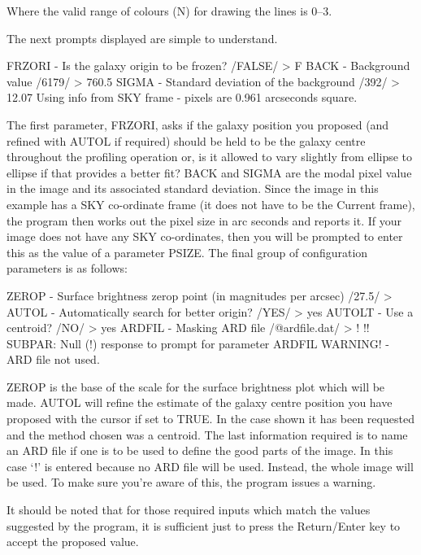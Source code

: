 \documentclass[twoside,11pt]{starlink}
\begin{document}
\begin{terminalv}
\end{terminalv}

Where the valid range of colours (N) for drawing the lines is 0--3.

The next prompts displayed are simple to understand.

\begin{terminalv}
FRZORI - Is the galaxy origin to be frozen? /FALSE/ > F
BACK - Background value /6179/ > 760.5
SIGMA - Standard deviation of the background /392/ > 12.07
Using info from SKY frame - pixels are  0.961 arcseconds square.
\end{terminalv}
The first parameter, FRZORI,
asks if the galaxy position you proposed (and refined with
AUTOL if required) should be held to
be the galaxy centre throughout the profiling operation or,
is it allowed to vary slightly
from ellipse to ellipse if that provides a better fit?
BACK and SIGMA are the modal pixel value in the image and its
associated standard deviation.
Since the image in this example has a SKY co-ordinate frame
(it does not have to be the Current frame),
the program then works out the pixel size in arc seconds and reports it.
If your image does not have any SKY co-ordinates, then you will
be prompted to enter this as the value of a parameter PSIZE.
The final group of configuration parameters is as follows:
\begin{terminalv}
ZEROP - Surface brightness zerop point (in magnitudes per arcsec) /27.5/ >
AUTOL - Automatically search for better origin? /YES/ > yes
AUTOLT - Use a centroid? /NO/ > yes
ARDFIL - Masking ARD file /@ardfile.dat/ > !
!! SUBPAR: Null (!) response to prompt for parameter ARDFIL
WARNING! - ARD file not used.
\end{terminalv}
ZEROP is the base of the scale for the surface brightness plot
which will be made.
AUTOL will refine
the estimate of the galaxy centre position you have proposed with the cursor
if set to TRUE. In the case shown it has been requested and the method
chosen was a centroid.
The last information required is to name an ARD file if one is to be used to
define the good parts of the image. In this case `!' is entered because no
ARD file will be used. Instead, the whole image will be used. To make sure
you're aware of this, the program issues a warning.

It should be noted that for those required inputs which match the
values suggested by the program, it is sufficient just to press
the Return/Enter key to accept the proposed value.
\end{document}
